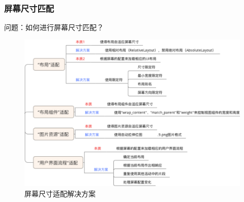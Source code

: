 \documentclass[9pt, b5paper]{article}
\begin{document}
\subsubsection{屏幕尺寸匹配}
\label{sec-6-6-1}

问题：如何进行屏幕尺寸匹配？

\begin{figure}[htb]
\centering
\includegraphics[width=.9\linewidth]{./pic/screenSize.png}
\caption{屏幕尺寸适配解决方案}
\end{figure}
\end{document}
